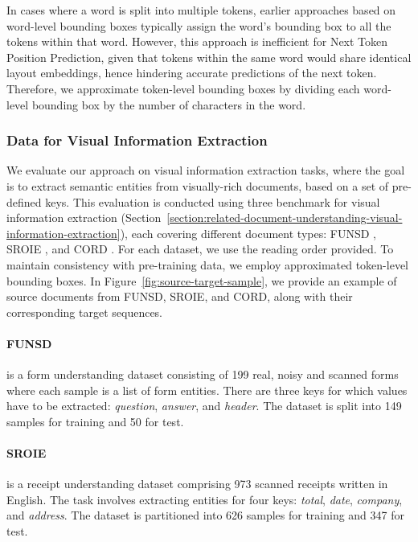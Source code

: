 In cases where a word is split into multiple tokens, earlier approaches based on word-level bounding boxes typically assign the word's bounding box to all the tokens within that word. However, this approach is inefficient for Next Token Position Prediction, given that tokens within the same word would share identical layout embeddings, hence hindering accurate predictions of the next token. Therefore, we approximate token-level bounding boxes by dividing each word-level bounding box by the number of characters in the word. 

\subsubsection{Data for Visual Information Extraction}

We evaluate our approach on visual information extraction tasks, where the goal is to extract semantic entities from visually-rich documents, based on a set of pre-defined keys. This evaluation is conducted using three benchmark for visual information extraction (Section~\ref{section:related-document-understanding-visual-information-extraction}), each covering different document types: FUNSD \citep{jaume2019funsd}, SROIE \citep{huang2019icdar2019}, and CORD \citep{park2019cord}. For each dataset, we use the reading order provided. To maintain consistency with pre-training data, we employ approximated token-level bounding boxes. In Figure~\ref{fig:source-target-sample}, we provide an example of source documents from FUNSD, SROIE, and CORD, along with their corresponding target sequences. 

\paragraph{FUNSD} \citep{jaume2019funsd} is a form understanding dataset consisting of 199 real, noisy and scanned forms where each sample is a list of form entities. There are three keys for which values have to be extracted: \textit{question}, \textit{answer}, and \textit{header}. The dataset is split into 149 samples for training and 50 for test.

\paragraph{SROIE} \citep{huang2019icdar2019} is a receipt understanding dataset comprising 973 scanned receipts written in English. The task involves extracting entities for four keys: \textit{total}, \textit{date}, \textit{company}, and \textit{address}. The dataset is partitioned into 626 samples for training and 347 for test. 

